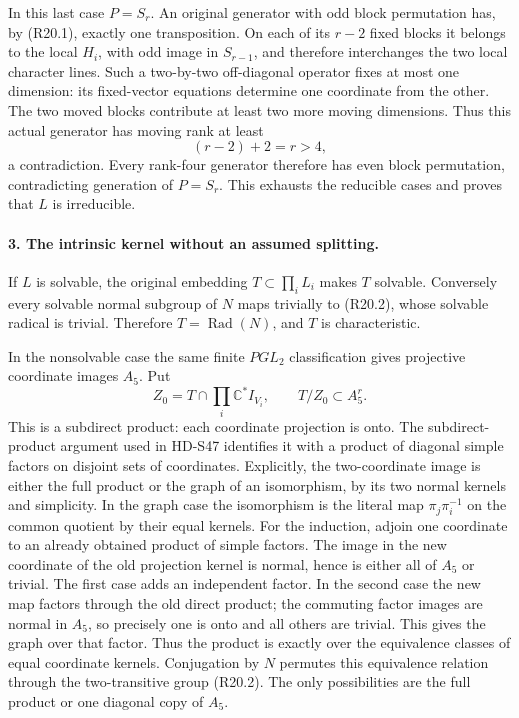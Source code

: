 In this last case \(P=S_r\). An original generator
with odd block permutation has, by (R20.1), exactly
one transposition. On each of its \(r-2\) fixed
blocks it belongs to the local \(H_i\), with odd
image in \(S_{r-1}\), and therefore interchanges
the two local character lines. Such a two-by-two
off-diagonal operator fixes at most one dimension:
its fixed-vector equations determine one coordinate
from the other. The two moved blocks contribute at
least two more moving dimensions. Thus this actual
generator has moving rank at least
\[
                              (r-2)+2=r>4,              \tag{R20.4}
\]
a contradiction. Every rank-four generator therefore
has even block permutation, contradicting generation
of \(P=S_r\). This exhausts the reducible cases and
proves that \(L\) is irreducible.

\paragraph{3. The intrinsic kernel without an assumed splitting.}
If \(L\) is solvable, the original embedding
\(T\subset\prod_i L_i\) makes \(T\) solvable.
Conversely every solvable normal subgroup of \(N\)
maps trivially to (R20.2), whose solvable radical is
trivial. Therefore \(T=\operatorname{Rad}(N)\), and
\(T\) is characteristic.

In the nonsolvable case the same finite \(PGL_2\)
classification gives projective coordinate images
\(A_5\). Put
\[
 Z_0=T\cap\prod_i\mathbb C^*I_{V_i},\qquad
                   T/Z_0\subset A_5^r.                 \tag{R20.5}
\]
This is a subdirect product: each coordinate projection
is onto. The subdirect-product argument used in HD-S47
identifies it with a product of diagonal simple factors
on disjoint sets of coordinates. Explicitly, the
two-coordinate image is either the full product or
the graph of an isomorphism, by its two normal kernels
and simplicity. In the graph case the isomorphism is
the literal map \(\pi_j\pi_i^{-1}\) on the common
quotient by their equal kernels. For the induction,
adjoin one coordinate to an already obtained product
of simple factors. The image in the new coordinate
of the old projection kernel is normal, hence is
either all of \(A_5\) or trivial. The first case
adds an independent factor. In the second case the
new map factors through the old direct product;
the commuting factor images are normal in \(A_5\),
so precisely one is onto and all others are trivial.
This gives the graph over that factor. Thus the
product is exactly over the equivalence classes of
equal coordinate kernels. Conjugation
by \(N\) permutes this equivalence relation through
the two-transitive group (R20.2). The only possibilities
are the full product or one diagonal copy of \(A_5\).


